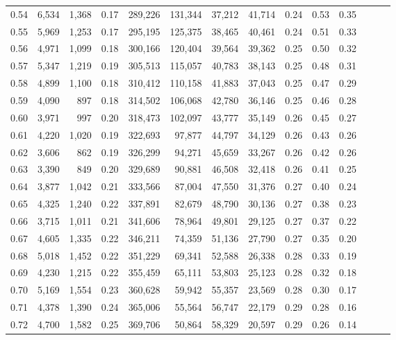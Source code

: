 \begin{tabular}{rrrrrrrrrrrrrr}
0.54 &  6,534 &  1,368 &  0.17 &  289,226 &  131,344 &  37,212 &  41,714 &  0.24 &  0.53 &      0.35 \\
0.55 &  5,969 &  1,253 &  0.17 &  295,195 &  125,375 &  38,465 &  40,461 &  0.24 &  0.51 &      0.33 \\
0.56 &  4,971 &  1,099 &  0.18 &  300,166 &  120,404 &  39,564 &  39,362 &  0.25 &  0.50 &      0.32 \\
0.57 &  5,347 &  1,219 &  0.19 &  305,513 &  115,057 &  40,783 &  38,143 &  0.25 &  0.48 &      0.31 \\
0.58 &  4,899 &  1,100 &  0.18 &  310,412 &  110,158 &  41,883 &  37,043 &  0.25 &  0.47 &      0.29 \\
0.59 &  4,090 &    897 &  0.18 &  314,502 &  106,068 &  42,780 &  36,146 &  0.25 &  0.46 &      0.28 \\
0.60 &  3,971 &    997 &  0.20 &  318,473 &  102,097 &  43,777 &  35,149 &  0.26 &  0.45 &      0.27 \\
0.61 &  4,220 &  1,020 &  0.19 &  322,693 &   97,877 &  44,797 &  34,129 &  0.26 &  0.43 &      0.26 \\
0.62 &  3,606 &    862 &  0.19 &  326,299 &   94,271 &  45,659 &  33,267 &  0.26 &  0.42 &      0.26 \\
0.63 &  3,390 &    849 &  0.20 &  329,689 &   90,881 &  46,508 &  32,418 &  0.26 &  0.41 &      0.25 \\
0.64 &  3,877 &  1,042 &  0.21 &  333,566 &   87,004 &  47,550 &  31,376 &  0.27 &  0.40 &      0.24 \\
0.65 &  4,325 &  1,240 &  0.22 &  337,891 &   82,679 &  48,790 &  30,136 &  0.27 &  0.38 &      0.23 \\
0.66 &  3,715 &  1,011 &  0.21 &  341,606 &   78,964 &  49,801 &  29,125 &  0.27 &  0.37 &      0.22 \\
0.67 &  4,605 &  1,335 &  0.22 &  346,211 &   74,359 &  51,136 &  27,790 &  0.27 &  0.35 &      0.20 \\
0.68 &  5,018 &  1,452 &  0.22 &  351,229 &   69,341 &  52,588 &  26,338 &  0.28 &  0.33 &      0.19 \\
0.69 &  4,230 &  1,215 &  0.22 &  355,459 &   65,111 &  53,803 &  25,123 &  0.28 &  0.32 &      0.18 \\
0.70 &  5,169 &  1,554 &  0.23 &  360,628 &   59,942 &  55,357 &  23,569 &  0.28 &  0.30 &      0.17 \\
0.71 &  4,378 &  1,390 &  0.24 &  365,006 &   55,564 &  56,747 &  22,179 &  0.29 &  0.28 &      0.16 \\
0.72 &  4,700 &  1,582 &  0.25 &  369,706 &   50,864 &  58,329 &  20,597 &  0.29 &  0.26 &      0.14 \\

\end{tabular}
